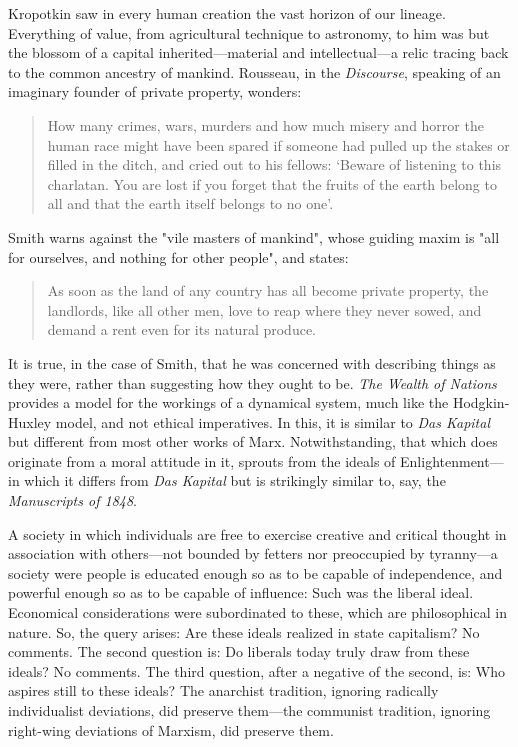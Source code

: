 \documentclass[a4paper]{article}
\begin{document}
Kropotkin saw in every human creation the vast horizon of our lineage.
Everything of value, from agricultural technique to astronomy, to him was but
the blossom of a capital inherited---material and intellectual---a relic
tracing back to the common ancestry of mankind. Rousseau, in the
\textit{Discourse}, speaking of an imaginary founder of private property,
wonders:

\begin{quote}
    How many crimes, wars, murders and how much misery and horror the human
    race might have been spared if someone had pulled up the stakes or filled
    in the ditch, and cried out to his fellows: ‘Beware of listening to this
    charlatan. You are lost if you forget that the fruits of the earth belong
    to all and that the earth itself belongs to no one’.
\end{quote}

Smith warns against  the "vile masters of mankind", whose guiding maxim is "all
for ourselves, and nothing for other people", and states:

\begin{quote}
    As soon as the land of any country has all become private property, the
    landlords, like all other men, love to reap where they never sowed, and
    demand a rent even for its natural produce.
\end{quote}

It is true, in the case of Smith, that he was concerned with describing things
as they were, rather than suggesting how they ought to be. \textit{The Wealth
of Nations} provides a model for the workings of a dynamical system, much like
the Hodgkin-Huxley model, and not ethical imperatives. In this, it is similar
to \textit{Das Kapital} but different from most other works of Marx.
Notwithstanding, that which does originate from a moral attitude in it, sprouts
from the ideals of Enlightenment---in which it differs from \textit{Das
Kapital} but is strikingly similar to, say, the \textit{Manuscripts of 1848}.

A society in which individuals are free to exercise creative and critical
thought in association with others---not bounded by fetters nor preoccupied by
tyranny---a society were people is educated enough so as to be capable of
independence, and powerful enough so as to be capable of influence: Such was
the liberal ideal. Economical considerations were subordinated to these, which
are philosophical in nature. So, the query arises: Are these ideals realized in
state capitalism? No comments. The second question is: Do liberals today truly
draw from these ideals? No comments. The third question, after a negative of
the second, is: Who aspires still to these ideals? The anarchist tradition,
ignoring radically individualist deviations, did preserve them---the communist
tradition, ignoring right-wing deviations of Marxism, did preserve them.
\end{document}
